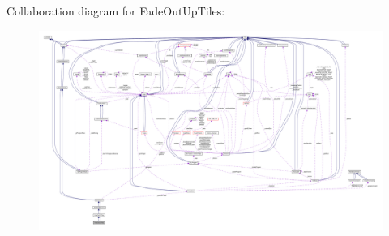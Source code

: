 Collaboration diagram for Fade\+Out\+Up\+Tiles\+:
\nopagebreak
\begin{figure}[H]
\begin{center}
\leavevmode
\includegraphics[width=350pt]{classFadeOutUpTiles__coll__graph}
\end{center}
\end{figure}
